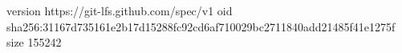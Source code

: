 version https://git-lfs.github.com/spec/v1
oid sha256:31167d735161e2b17d15288fc92cd6af710029bc2711840add21485f41e1275f
size 155242
